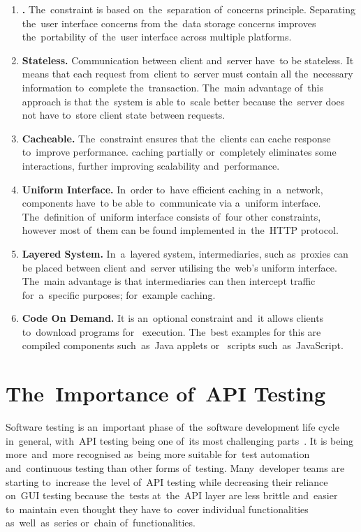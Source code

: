 \begin{enumerate}
  \item \textbf{.} The~constraint is based
  on~the~separation of~concerns principle. Separating the~user interface
  concerns from the~data storage concerns improves the~portability of~the~user
  interface across multiple platforms.
  \item \textbf{Stateless.} Communication between client and~server have~to be
  stateless. It means that each request from~client to~server must contain all
  the~necessary information to~complete the~transaction. The~main advantage
  of~this approach is that the~system is able to~scale better because the~server
  does not have to~store client state between requests.
  \item \textbf{Cacheable.} The~constraint ensures that the~clients can cache
  response to~improve performance.  caching partially
  or~completely eliminates some  interactions, further
  improving scalability and~performance.
  \item \textbf{Uniform Interface.} In~order to~have efficient caching
  in~a~network, components have~to be able to~communicate via a~uniform
  interface.
  The~definition of~uniform interface consists of~four other constraints,
  however most of~them can be found implemented in~the~HTTP protocol.
  \item \textbf{Layered System.} In~a~layered system, intermediaries, such
  as~proxies can be placed between client and~server utilising the~web's uniform
  interface. The~main advantage is that intermediaries can then intercept
   traffic for~a~specific purposes; for~example caching.
  \item \textbf{Code On Demand.} It is an~optional constraint and~it allows
  clients to~download programs for~ execution. The~best examples
  for this are compiled components such~as~Java applets or~
  scripts such~as~JavaScript.
\end{enumerate}


\section{The~Importance of~API Testing}
\label{frameworks}
Software testing is an~important phase of~the~software development life cycle
in~general, with~API testing being one of~its most challenging
parts~\cite{TestingAPI}. It is being more~and~more recognised as~being more
suitable for~test automation and~continuous testing than other forms of~testing.
Many~developer teams are starting to~increase the~level of~API testing while
decreasing their reliance on~GUI testing because the~tests at~the~API layer are
less brittle and~easier to~maintain even thought they have to~cover
individual functionalities as~well~as~series or~chain of~functionalities.

